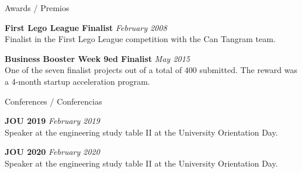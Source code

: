 \documentclass{resume} %
\begin{document}
\begin{rSection}{Awards / Premios}

    {\bf  First Lego League Finalist} \hfill {\em February 2008} \\ 
    Finalist in the First Lego League competition with the Can Tangram team.

    {\bf  Business Booster Week 9ed Finalist} \hfill {\em May 2015} \\ 
    One of the seven finalist projects out of a total of 400 submitted. The reward was a 4-month startup acceleration program.
    
\end{rSection}


\begin{rSection}{Conferences / Conferencias}

    {\bf  JOU 2019} \hfill {\em February 2019} \\ 
    Speaker at the engineering study table II at the University Orientation Day.

    {\bf  JOU 2020} \hfill {\em February 2020} \\ 
    Speaker at the engineering study table II at the University Orientation Day.
    
\end{rSection}





\end{document}
